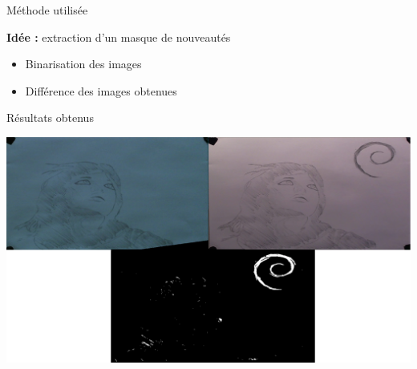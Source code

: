 \documentclass[t,14pt]{beamer}
\begin{document}
\begin{frame}{Méthode utilisée}
\vspace{5mm}
\begin{block}{}
\textbf{Idée :} extraction d'un masque de nouveautés
\end{block}
\begin{itemize}
\item Binarisation des images
\item Différence des images obtenues
\end{itemize}
\end{frame}

\begin{frame}{Résultats obtenus}
\vspace{5mm}
\begin{center}
\includegraphics[width=\textwidth]{images/evo/masque.png}
\end{center}
\end{frame}
\end{document}
